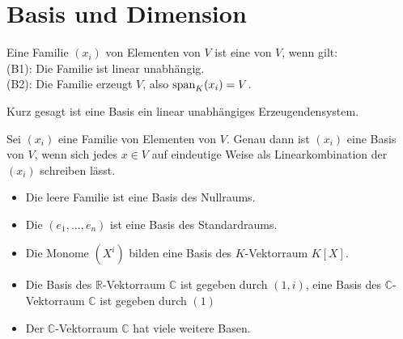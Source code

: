 \section{Basis und Dimension}

\begin{definition}[Basis]
	Eine Familie $(x_i)$ von Elementen von $V$ ist eine  von $V$, wenn gilt: \\
	(B1): Die Familie ist linear unabhängig. \\
	(B2): Die Familie erzeugt $V$, also $\operatorname{span}_K(x_i) = V$.
\end{definition}

\begin{remark}
	Kurz gesagt ist eine Basis ein linear unabhängiges Erzeugendensystem.
\end{remark}

\begin{proposition}
	Sei $(x_i)$ eine Familie von Elementen von $V$. Genau dann ist $(x_i)$ eine Basis von $V$, 
	wenn sich jedes $x \in V$ auf eindeutige Weise als Linearkombination der $(x_i)$ schreiben lässt.
\end{proposition}

\begin{example}
	\begin{itemize}
		\item Die leere Familie ist eine Basis des Nullraums.
		\item Die  $(e_1,...,e_n)$ ist eine Basis des Standardraums.
		\item Die Monome $(X^i)$ bilden eine Basis des $K$-Vektorraum $K[X]$.
		\item Die Basis des $\mathbb R$-Vektorraum $\mathbb C$ ist gegeben durch $(1,i)$, eine Basis des $\mathbb C$-
		Vektorraum $\mathbb C$ ist gegeben durch $(1)$
		\item Der $\mathbb C$-Vektorraum $\mathbb C$ hat viele weitere Basen.
	\end{itemize}
\end{example}

